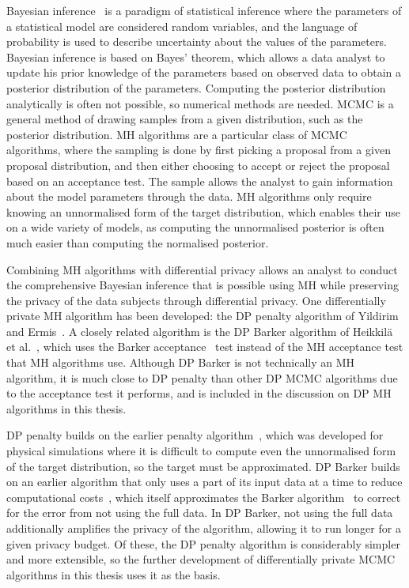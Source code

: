 \documentclass[english,twoside,openright]{HYgraduMLDS}
\begin{document}
Bayesian inference~\cite{BDA} is a paradigm of statistical inference where
the parameters of a statistical model are considered random variables, and
the language of probability is used to describe uncertainty about the values of the
parameters. Bayesian inference is based on Bayes' theorem, which allows
a data analyst to update his prior knowledge of the parameters based on observed
data to obtain a posterior distribution of the parameters.
Computing the posterior distribution analytically is often not possible,
so numerical methods are needed. MCMC is a general
method of drawing samples from a given distribution, such as the
posterior distribution. MH algorithms are a particular class
of MCMC algorithms, where
the sampling is done by first picking a proposal from a given proposal distribution,
and then either choosing to accept or reject the proposal based on an acceptance
test. The sample allows
the analyst to gain information about the model parameters through the data.
MH algorithms only require knowing an unnormalised form of the target distribution,
which enables their use on a wide variety of models, as computing the unnormalised
posterior is often much easier than computing the normalised posterior.

Combining MH algorithms with differential privacy allows
an analyst to conduct the comprehensive Bayesian inference that is
possible using MH while preserving the privacy of the data subjects through
differential privacy. One differentially private MH algorithm has been
developed: the DP penalty algorithm of Yildirim and Ermis~\cite{YildirimE19}.
A closely related algorithm is the DP Barker algorithm of
Heikkilä et al.~\cite{HeikkilaJDH19}, which uses the Barker
acceptance~\cite{Barker65} test instead of the MH acceptance test
that MH algorithms use. Although DP Barker is not technically an MH algorithm,
it is much close to DP penalty than other DP MCMC algorithms due to the
acceptance test it performs, and is included in the discussion on DP MH
algorithms in this thesis.

DP penalty builds on the earlier penalty algorithm~\cite{CeD99}, which was
developed for physical simulations where it is difficult to compute even the
unnormalised form of the target distribution, so the target
must be approximated. DP Barker builds on an earlier algorithm that only
uses a part of its input data at a time to reduce computational
costs~\cite{SPC17}, which itself approximates the Barker algorithm~\cite{Barker65}
to correct for the error from not using the full data. In DP Barker, not using the
full data additionally amplifies the privacy of the algorithm,
allowing it to run longer for a given privacy budget.
Of these, the DP penalty algorithm is considerably simpler and more extensible,
so the further development of differentially private MCMC algorithms in this
thesis uses it as the basis.
\end{document}
